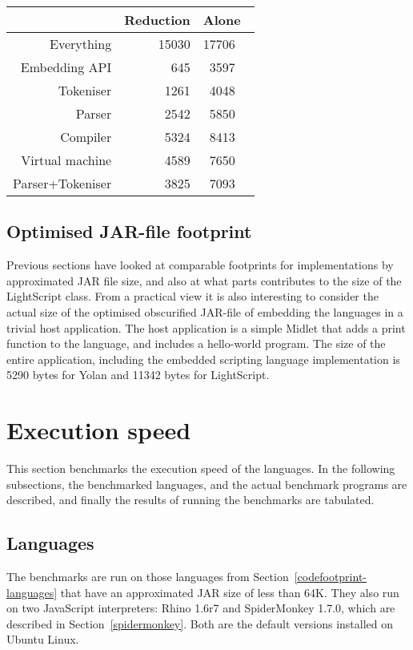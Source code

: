 \documentclass[11pt]{report}
\begin{document}
\begin{center} \begin{tabular}{|r|r|rl|} \hline
&\multicolumn{1}{|r|}{Reduction} & \multicolumn{2}{|l|}{Alone}\\ \hline
Everything & 15030 & 17706 & \\ \hline
Embedding API & 645  & 3597  & \\ \hline
Tokeniser & 1261 & 4048 & \\ \hline
Parser & 2542 & 5850 & \\ \hline
Compiler & 5324 & 8413 & \\ \hline
Virtual machine & 4589 & 7650 & \\ \hline
Parser+Tokeniser & 3825 & 7093 & \\ \hline
\end{tabular} \end{center}

\subsection{Optimised JAR-file footprint}
Previous sections have looked at comparable footprints for implementations by approximated JAR file size, and also at what parts contributes to the size of the LightScript class.
From a practical view it is also interesting to consider the actual size of the optimised obscurified JAR-file of embedding the languages in a trivial host application.
The host application is a simple Midlet that adds a print function to the language, and includes a hello-world program.
The size of the entire application, including the embedded scripting language implementation is 5290 bytes for Yolan and 11342 bytes for LightScript.

\section{Execution speed}
This section benchmarks the execution speed of the languages. 
In the following subsections, the benchmarked languages, and the actual benchmark programs are described, and finally the results of running the benchmarks are tabulated. 

\subsection{Languages}
The benchmarks are run on those languages from Section~\ref{codefootprint-languages} that have an approximated JAR size of less than 64K. They also run on two JavaScript interpreters: Rhino 1.6r7 and SpiderMonkey 1.7.0, which are described in Section~\ref{spidermonkey}. Both are the default versions installed on Ubuntu Linux.
\end{document}
